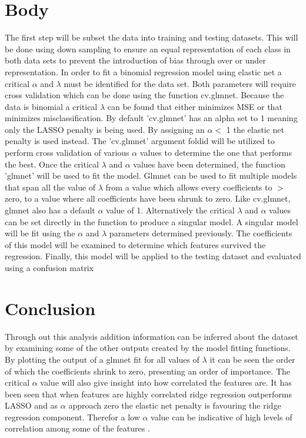 \documentclass[10pt]{article}
\begin{document}
\section{Body}\label{sec:body}
The first step will be subset the data into training and testing datasets. This will be done using down sampling to ensure an equal representation of each class in both data sets to prevent the introduction of bias through over or under representation. In order to fit a binomial regression model using elastic net a critical $\alpha$ and $\lambda$ must be identified for the data set. Both parameters will require cross validation which can be done using the function cv.glmnet.  Because the data is binomial a critical $\lambda$ can be found that either minimizes MSE or that minimizes misclassification. By default 'cv.glmnet' has an alpha set to 1 meaning only the LASSO penalty is being used. By assigning an $\alpha  < $ 1  the elastic net penalty is used instead. The 'cv.glmnet'  argument foldid will be utilized to perform cross validation of various $\alpha$ values to determine the one that performs the best. Once the critical $\lambda$ and $\alpha$ values have been determined, the function 'glmnet' will be used to fit the model. Glmnet can be used to fit multiple models that span all the value of $\lambda$ from a value which allows every coefficients to $ > $ zero, to a value where all coefficients have been shrunk to zero. Like cv.glmnet, glmnet also has a default $\alpha$ value of 1.  Alternatively the critical $\lambda$ and $\alpha$ values can be set directly in the function to produce a singular model. A singular model will be fit using the $\alpha$ and $\lambda$ parameters determined previously. The coefficients of this model will be examined to determine which features survived the regression. Finally, this model will be applied to the testing dataset and evaluated using a confusion matrix

\section{Conclusion}\label{sec:conclusion}
Through out this analysis addition information can be inferred about the dataset by examining some of the other outputs created by the model fitting functions. By plotting the output of a glmnet fit for all values of $\lambda$ it can be seen the order of which the coefficients shrink to zero, presenting an order of importance. The critical $\alpha$ value will also give insight into how correlated the features are. It has been seen that when features are highly correlated ridge regression outperforms LASSO and as $\alpha$ approach zero the elastic net penalty is favouring the ridge regression component. Therefor a low $\alpha$ value can be indicative of high levels of correlation among some of the features\cite{2} .
\end{document}

